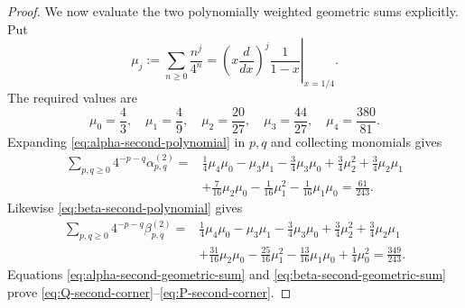 \documentclass[11pt]{article}
\theoremstyle{definition}
\theoremstyle{remark}
\begin{document}
\begin{proof}
We now evaluate the two polynomially weighted geometric sums explicitly.
Put
\begin{equation}
 \mu_j:=\sum_{n\ge0}\frac{n^j}{4^n}
 =\left.
 \left(x\frac{d}{dx}\right)^j\frac1{1-x}
 \right|_{x=1/4}.
 \label{eq:quarter-geometric-moments}
\end{equation}
The required values are
\begin{equation}
 \mu_0=\frac43,\quad \mu_1=\frac49,\quad
 \mu_2=\frac{20}{27},\quad \mu_3=\frac{44}{27},\quad
 \mu_4=\frac{380}{81}.
 \label{eq:quarter-moment-values}
\end{equation}
Expanding \eqref{eq:alpha-second-polynomial} in \(p,q\) and collecting
monomials gives
\begin{align}
 \sum_{p,q\ge0}4^{-p-q}\alpha^{(2)}_{p,q}
 ={}&
 \frac14\mu_4\mu_0-\mu_3\mu_1-\frac34\mu_3\mu_0
 +\frac34\mu_2^2+\frac34\mu_2\mu_1\nonumber\\
 &+\frac7{16}\mu_2\mu_0-\frac1{16}\mu_1^2
 -\frac1{16}\mu_1\mu_0
 =\frac{61}{243}.
 \label{eq:alpha-second-geometric-sum}
\end{align}
Likewise \eqref{eq:beta-second-polynomial} gives
\begin{align}
 \sum_{p,q\ge0}4^{-p-q}\beta^{(2)}_{p,q}
 ={}&
 \frac14\mu_4\mu_0-\mu_3\mu_1-\frac34\mu_3\mu_0
 +\frac34\mu_2^2+\frac34\mu_2\mu_1\nonumber\\
 &+\frac{31}{16}\mu_2\mu_0-\frac{25}{16}\mu_1^2
 -\frac{13}{16}\mu_1\mu_0+\frac14\mu_0^2
 =\frac{349}{243}.
 \label{eq:beta-second-geometric-sum}
\end{align}
Equations \eqref{eq:alpha-second-geometric-sum} and
\eqref{eq:beta-second-geometric-sum} prove
\eqref{eq:Q-second-corner}--\eqref{eq:P-second-corner}.


\end{proof}
\end{document}
